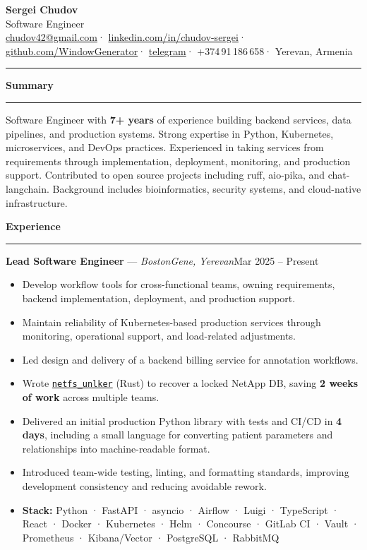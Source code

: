 \documentclass[10pt]{article}
\newenvironment{cvlist}{%
  \begin{itemize}%
  \setlength{\itemsep}{1pt}%
  \setlength{\topsep}{2pt}%
  \setlength{\parsep}{0pt}%
  \setlength{\leftmargin}{1.3em}%
  \small%
}{%
  \end{itemize}%
}
\newcommand{\cvsection}[1]{%
  \vspace{9pt}%
  {\bfseries\large #1}%
  \par\nobreak\vspace{-4pt}%
  \rule{\linewidth}{0.5pt}%
  \vspace{4pt}%
}
\newcommand{\job}[3]{%
  \textbf{#1} — \textit{#2}\hfill{\small\color{muted}#3}%
  \par\vspace{1pt}%
}
\newcommand{\profilebox}[1]{%
  \vspace{2pt}%
  {\small #1}%
  \vspace{2pt}%
}
\begin{document}
\pagestyle{empty}

\begin{center}
  {\fontsize{26}{30}\selectfont\textbf{Sergei Chudov}}\\[4pt]
  {\large\color{muted}Software Engineer}\\[6pt]
  \small
  \href{mailto:chudov42@gmail.com}{chudov42@gmail.com}\enspace\textcolor{muted}{·}\enspace
  \href{https://www.linkedin.com/in/chudov-sergei}{linkedin.com/in/chudov-sergei}\enspace\textcolor{muted}{·}\enspace
  \href{https://github.com/WindowGenerator}{github.com/WindowGenerator}\enspace\textcolor{muted}{·}\enspace
  \href{https://t.me/WindowGenerator}{telegram}\enspace\textcolor{muted}{·}\enspace
  +374\,91\,186\,658\enspace\textcolor{muted}{·}\enspace
  Yerevan, Armenia
\end{center}

\rule{\linewidth}{0.8pt}
\vspace{2pt}

\cvsection{Summary}
\profilebox{Software Engineer with \textbf{7+ years} of experience building backend services,
data pipelines, and production systems. Strong expertise in Python, Kubernetes,
microservices, and DevOps practices. Experienced in taking services from requirements
through implementation, deployment, monitoring, and production support. Contributed to
open source projects including ruff, aio-pika, and chat-langchain. Background includes
bioinformatics, security systems, and cloud-native infrastructure.}

\cvsection{Experience}

\job{Lead Software Engineer}{BostonGene, Yerevan}{Mar 2025 – Present}
\begin{cvlist}
  \item Develop workflow tools for cross-functional teams, owning requirements, backend implementation, deployment, and production support.
  \item Maintain reliability of Kubernetes-based production services through monitoring, operational support, and load-related adjustments.
  \item Led design and delivery of a backend billing service for annotation workflows.
  \item Wrote \href{https://github.com/WindowGenerator/netfs_unlker}{\texttt{netfs\_unlker}} (Rust) to recover a locked NetApp DB, saving \textbf{2 weeks of work} across multiple teams.
  \item Delivered an initial production Python library with tests and CI/CD in \textbf{4 days}, including a small language for converting patient parameters and relationships into machine-readable format.
  \item Introduced team-wide testing, linting, and formatting standards, improving development consistency and reducing avoidable rework.
  \item \textbf{Stack:} Python · FastAPI · asyncio · Airflow · Luigi · TypeScript · React · Docker · Kubernetes · Helm · Concourse · GitLab CI · Vault · Prometheus · Kibana/Vector · PostgreSQL · RabbitMQ
\end{cvlist}
\end{document}
